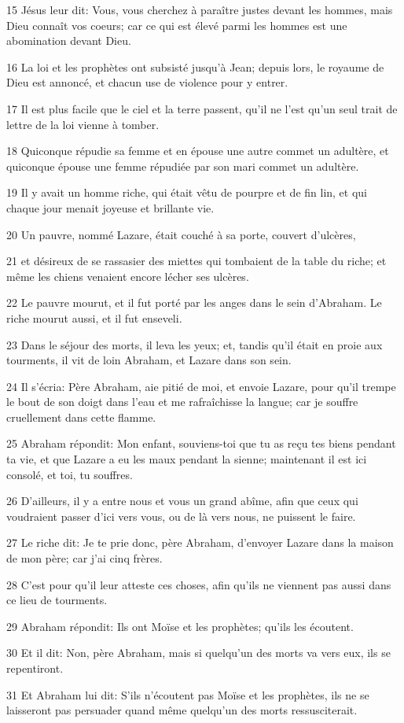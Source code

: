 \par 15 Jésus leur dit: Vous, vous cherchez à paraître justes devant les hommes, mais Dieu connaît vos coeurs; car ce qui est élevé parmi les hommes est une abomination devant Dieu.
\par 16 La loi et les prophètes ont subsisté jusqu'à Jean; depuis lors, le royaume de Dieu est annoncé, et chacun use de violence pour y entrer.
\par 17 Il est plus facile que le ciel et la terre passent, qu'il ne l'est qu'un seul trait de lettre de la loi vienne à tomber.
\par 18 Quiconque répudie sa femme et en épouse une autre commet un adultère, et quiconque épouse une femme répudiée par son mari commet un adultère.
\par 19 Il y avait un homme riche, qui était vêtu de pourpre et de fin lin, et qui chaque jour menait joyeuse et brillante vie.
\par 20 Un pauvre, nommé Lazare, était couché à sa porte, couvert d'ulcères,
\par 21 et désireux de se rassasier des miettes qui tombaient de la table du riche; et même les chiens venaient encore lécher ses ulcères.
\par 22 Le pauvre mourut, et il fut porté par les anges dans le sein d'Abraham. Le riche mourut aussi, et il fut enseveli.
\par 23 Dans le séjour des morts, il leva les yeux; et, tandis qu'il était en proie aux tourments, il vit de loin Abraham, et Lazare dans son sein.
\par 24 Il s'écria: Père Abraham, aie pitié de moi, et envoie Lazare, pour qu'il trempe le bout de son doigt dans l'eau et me rafraîchisse la langue; car je souffre cruellement dans cette flamme.
\par 25 Abraham répondit: Mon enfant, souviens-toi que tu as reçu tes biens pendant ta vie, et que Lazare a eu les maux pendant la sienne; maintenant il est ici consolé, et toi, tu souffres.
\par 26 D'ailleurs, il y a entre nous et vous un grand abîme, afin que ceux qui voudraient passer d'ici vers vous, ou de là vers nous, ne puissent le faire.
\par 27 Le riche dit: Je te prie donc, père Abraham, d'envoyer Lazare dans la maison de mon père; car j'ai cinq frères.
\par 28 C'est pour qu'il leur atteste ces choses, afin qu'ils ne viennent pas aussi dans ce lieu de tourments.
\par 29 Abraham répondit: Ils ont Moïse et les prophètes; qu'ils les écoutent.
\par 30 Et il dit: Non, père Abraham, mais si quelqu'un des morts va vers eux, ils se repentiront.
\par 31 Et Abraham lui dit: S'ils n'écoutent pas Moïse et les prophètes, ils ne se laisseront pas persuader quand même quelqu'un des morts ressusciterait.

